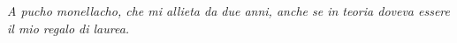 \null\vfill
\begin{flushright}
{\ttfamily } \emph{A pucho monellacho, che mi allieta da due anni, anche se in teoria doveva essere il mio regalo di laurea.}
\end{flushright}
\vfill\vfill